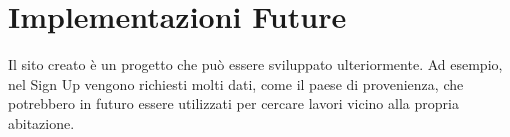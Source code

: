 \section{Implementazioni Future}
Il sito creato è un progetto che può essere sviluppato ulteriormente. Ad esempio, nel Sign Up vengono richiesti molti dati, come il paese di provenienza, che potrebbero in futuro essere utilizzati per cercare lavori vicino alla propria abitazione. \\